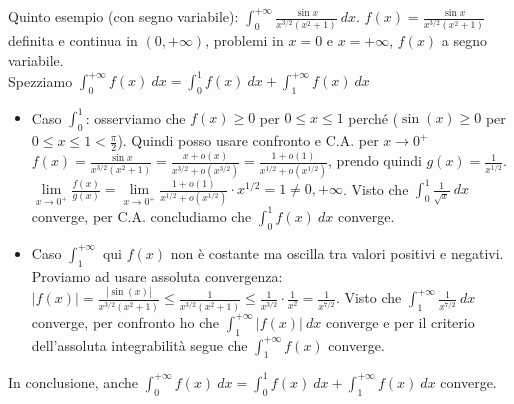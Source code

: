 \begin{example}
Quinto esempio (con segno variabile): $\int_0^{+\infty}\frac{\sin{x}}{x^{3/2}(x^2+1)}\:dx$. $f(x) = \frac{\sin{x}}{x^{3/2}(x^2+1)}$ definita e continua in $(0,+\infty)$, problemi in $x=0$ e $x=+\infty$, $f(x)$ a segno variabile.\\
Spezziamo $\int_0^{+\infty}f(x)\:dx = \int_0^1f(x)\:dx + \int_1^{+\infty}f(x)\:dx$
\begin{itemize}
    \item Caso $\int_0^1$: osserviamo che $f(x) \geq 0$ per $0 \leq x \leq 1$ perché ($\sin(x) \geq 0$ per $0 \leq x \leq 1 < \frac{\pi}{2}$). Quindi posso usare confronto e C.A. per $x\to 0^+$ $f(x) =\frac{\sin{x}}{x^{3/2}(x^2+1)} = \frac{x+o(x)}{x^{3/2} + o(x^{3/2})} = \frac{1 + o(1)}{x^{1/2}+o(x^{1/2})}$, prendo quindi $g(x) = \frac{1}{x^{1/2}}$.\\
    $\lim\limits_{x\to 0^+}\frac{f(x)}{g(x)} = \lim\limits_{x\to 0^+} \frac{1 + o(1)}{x^{1/2}+o(x^{1/2})} \cdot x^{1/2} = 1 \neq 0,+\infty$. Visto che $\int_0^1 \frac{1}{\sqrt{x}}\:dx$ converge, per C.A. concludiamo che $\int_0^1 f(x)\:dx$ converge.
    \item Caso $\int_1^{+\infty}$ qui $f(x)$ non è costante ma oscilla tra valori positivi e negativi. Proviamo ad usare assoluta convergenza:\\
    $|f(x)| = \frac{|\sin(x)|}{x^{3/2}(x^2+1)} \leq \frac{1}{x^{3/2}(x^2 + 1)} \leq \frac{1}{x^{3/2}}\cdot \frac{1}{x^2} = \frac{1}{x^{7/2}}$. Visto che $\int_1^{+\infty}\frac{1}{x^{7/2}}\:dx$ converge, per confronto ho che $\int_1^{+\infty}|f(x)|\:dx$ converge e per il criterio dell'assoluta integrabilità segue che $\int_1^{+\infty}f(x)$ converge.
\end{itemize}
In conclusione, anche $\int_0^{+\infty}f(x)\:dx = \int_0^1 f(x)\:dx + \int_1^{+\infty}f(x)\:dx$ converge.
\end{example}